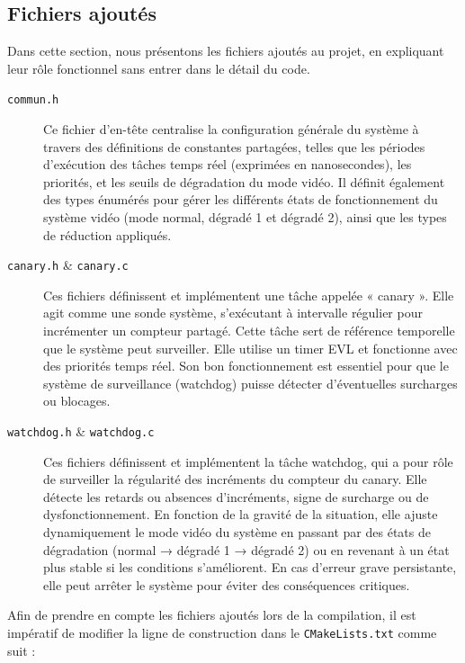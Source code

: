 \documentclass[a4paper,12pt]{article}
\begin{document}
\break

\subsection{Fichiers ajoutés}

Dans cette section, nous présentons les fichiers ajoutés au projet, en expliquant leur rôle fonctionnel sans entrer dans le détail du code.

\begin{description}

  \item[\texttt{commun.h}]  
  Ce fichier d'en-tête centralise la configuration générale du système à travers des définitions de constantes partagées, telles que les périodes d'exécution des tâches temps réel (exprimées en nanosecondes), les priorités, et les seuils de dégradation du mode vidéo. Il définit également des types énumérés pour gérer les différents états de fonctionnement du système vidéo (mode normal, dégradé 1 et dégradé 2), ainsi que les types de réduction appliqués.

  \item[\texttt{canary.h} \& \texttt{canary.c}]  
  Ces fichiers définissent et implémentent une tâche appelée « canary ». Elle agit comme une sonde système, s'exécutant à intervalle régulier pour incrémenter un compteur partagé. Cette tâche sert de référence temporelle que le système peut surveiller. Elle utilise un timer EVL et fonctionne avec des priorités temps réel. Son bon fonctionnement est essentiel pour que le système de surveillance (watchdog) puisse détecter d'éventuelles surcharges ou blocages.

  \item[\texttt{watchdog.h} \& \texttt{watchdog.c}]  
  Ces fichiers définissent et implémentent la tâche watchdog, qui a pour rôle de surveiller la régularité des incréments du compteur du canary. Elle détecte les retards ou absences d'incréments, signe de surcharge ou de dysfonctionnement. En fonction de la gravité de la situation, elle ajuste dynamiquement le mode vidéo du système en passant par des états de dégradation (normal → dégradé 1 → dégradé 2) ou en revenant à un état plus stable si les conditions s'améliorent. En cas d'erreur grave persistante, elle peut arrêter le système pour éviter des conséquences critiques.

\end{description}

Afin de prendre en compte les fichiers ajoutés lors de la compilation, il est impératif de modifier la ligne de construction dans le \texttt{CMakeLists.txt} comme suit :
\end{document}
